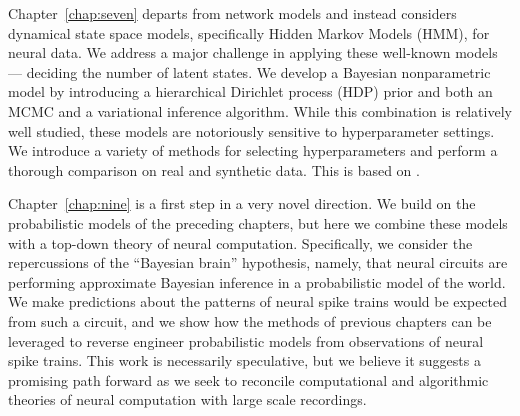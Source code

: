 Chapter~\ref{chap:seven} departs from network models and instead considers 
dynamical state space models, specifically Hidden Markov Models (HMM), for 
neural data. We address a major challenge in applying these well-known models ---
deciding the number of latent states. We develop a Bayesian nonparametric model 
by introducing a hierarchical Dirichlet process (HDP) prior and both an MCMC 
and a variational inference algorithm. While this 
combination is relatively well studied, these models are notoriously 
sensitive to hyperparameter settings. We introduce a variety of methods for 
selecting hyperparameters and perform a thorough comparison on real and synthetic 
data. This is based on \citet{linderman2016nonparametric}.

Chapter~\ref{chap:nine} is a first step in a very novel direction. We build on 
the probabilistic models of the preceding chapters, but here we combine these 
models with a top-down theory of neural computation. Specifically, we consider 
the repercussions of the ``Bayesian brain'' hypothesis, namely, that neural 
circuits are performing approximate Bayesian inference in a probabilistic model
of the world. We make predictions about the patterns of neural
spike trains would be expected from such a circuit, and we show how the methods 
of previous chapters can be leveraged to reverse engineer probabilistic models 
from observations of neural spike trains. This work is necessarily speculative, 
but we believe it suggests a promising path forward as we seek to reconcile 
computational and algorithmic theories of neural computation with large scale 
recordings. 


